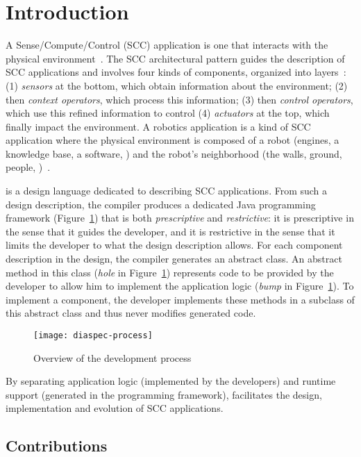 \section{Introduction}

A Sense/Compute/Control (SCC) application is one that interacts with
the physical environment~\cite{Tayl09a}. The SCC architectural pattern
guides the description of SCC applications and involves four kinds of
components, organized into layers~\cite{Cass11a,Edwar09a}: (1)
\emph{sensors} at the bottom, which obtain information about the
environment; (2) then \emph{context operators}, which process this
information; (3) then \emph{control operators}, which use this refined
information to control (4) \emph{actuators} at the top, which finally
impact the environment. A robotics application is a kind of SCC
application where the physical environment is composed of a robot
(engines, a knowledge base, a software, \etc{}) and the robot's
neighborhood (the walls, ground, people, \etc{})~\cite{Sicil08a}.

\diaspec{} is a design language dedicated to describing SCC
applications. From such a design description, the \diaspec{} compiler
produces a dedicated Java programming framework
(Figure~\ref{fig:diaspec-process}) that is both \emph{prescriptive}
and \emph{restrictive}: it is prescriptive in the sense that it guides
the developer, and it is restrictive in the sense that it limits the
developer to what the design description allows. For each component
description in the design, the compiler generates an abstract class.
An abstract method in this class (\emph{hole} in
Figure~\ref{fig:diaspec-process}) represents code to be provided by
the developer to allow him to implement the application logic
(\textit{bump} in Figure~\ref{fig:diaspec-process}). To implement a
component, the developer implements these methods in a subclass of
this abstract class and thus never modifies generated code.

\begin{figure}
  \centering
  \texttt{[image: diaspec-process]}
  \caption{Overview of the \diaspec{} development process}
  \label{fig:diaspec-process}
\end{figure}


By separating application logic (implemented by the developers) and
runtime support (generated in the programming framework), \diaspec{}
facilitates the design, implementation and evolution of SCC
applications. 

\subsection*{Contributions}


